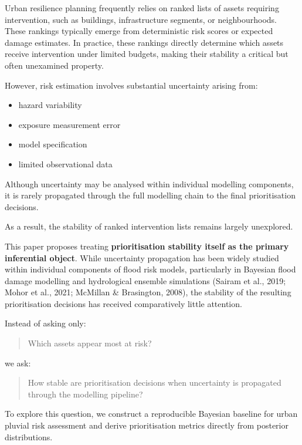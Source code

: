 \documentclass[
]{article}
\providecommand{\tightlist}{%
  \setlength{\itemsep}{0pt}\setlength{\parskip}{0pt}}
\begin{document}
Urban resilience planning frequently relies on ranked lists of assets
requiring intervention, such as buildings, infrastructure segments, or
neighbourhoods. These rankings typically emerge from deterministic risk
scores or expected damage estimates. In practice, these rankings
directly determine which assets receive intervention under limited
budgets, making their stability a critical but often unexamined
property.

However, risk estimation involves substantial uncertainty arising from:

\begin{itemize}
\tightlist
\item
  hazard variability
\item
  exposure measurement error
\item
  model specification
\item
  limited observational data
\end{itemize}

Although uncertainty may be analysed within individual modelling
components, it is rarely propagated through the full modelling chain to
the final prioritisation decisions.

As a result, the stability of ranked intervention lists remains largely
unexplored.

This paper proposes treating \textbf{prioritisation stability itself as
the primary inferential object}. While uncertainty propagation has been
widely studied within individual components of flood risk models,
particularly in Bayesian flood damage modelling and hydrological
ensemble simulations (Sairam et al., 2019; Mohor et al., 2021; McMillan
\& Brasington, 2008), the stability of the resulting prioritisation
decisions has received comparatively little attention.

Instead of asking only:

\begin{quote}
Which assets appear most at risk?
\end{quote}

we ask:

\begin{quote}
How stable are prioritisation decisions when uncertainty is propagated
through the modelling pipeline?
\end{quote}

To explore this question, we construct a reproducible Bayesian baseline
for urban pluvial risk assessment and derive prioritisation metrics
directly from posterior distributions.
\end{document}
